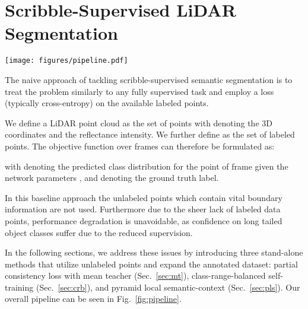 \documentclass[10pt,twocolumn,letterpaper]{article}
\begin{document}
\section{Scribble-Supervised LiDAR Segmentation}

\begin{figure*}
    \centering
    \texttt{[image: figures/pipeline.pdf]}
    \caption{Illustration of the proposed pipeline for scribble-supervised LiDAR semantic segmentation comprising of three steps: training, pseudo-labeling, distillation. During training, we preform pyramid local semantic-context (PLS) augmentation before training the mean teacher model on the available scribble-annotations. During pseudo-labeling, we generate target labels in a class-range-balanced (CRB) manner. Finally during distillation, we retrain the mean teacher on the generated pseudo-labels.  and  denote the losses applied to the supervised- and unsupervised set of points respectively. Gray arrows propagate label information.}
    \label{fig:pipeline}
\end{figure*}

The naive approach of tackling scribble-supervised semantic segmentation is to treat the problem similarly to any fully supervised task and employ a loss  (typically cross-entropy) on the available labeled points. 

We define a LiDAR point cloud  as the set of points  with  denoting the 3D coordinates and  the reflectance intensity. We further define  as the set of labeled points. The objective function over  frames can therefore be formulated as:

with  denoting the predicted class distribution for the point  of frame  given the network parameters , and  denoting the ground truth label.

In this baseline approach the unlabeled points which contain vital boundary information are not used. Furthermore due to the sheer lack of labeled data points, performance degradation is unavoidable, as confidence on long tailed object classes suffer due to the reduced supervision.

In the following sections, we address these issues by introducing three stand-alone methods that utilize unlabeled points and expand the annotated dataset: partial consistency loss with mean teacher (Sec.~\ref{sec:mt}), class-range-balanced self-training (Sec.~\ref{sec:crb}), and pyramid local semantic-context (Sec.~\ref{sec:pls}). Our overall pipeline can be seen in Fig.~\ref{fig:pipeline}.
\end{document}
